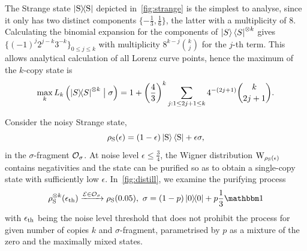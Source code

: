 \documentclass[pra,
aps,
twocolumn,
superscriptaddress,
groupedaddress,
nofootinbib,
reprint
]{revtex4-1}
\begin{document}
The Strange state $\ketbra{\rm{S}}$ depicted in~\cref{fig:strange} is the simplest to analyse, since it only has two distinct components $\{ -\frac{1}{3}, \frac{1}{6} \}$, the latter with a multiplicity of 8.
Calculating the binomial expansion for the components of $\ket{S}\bra{S}^{\otimes k}$ gives $\{(-1)^j 2^{j-k} 3^{-k}\}_{0 \leq j \leq k}$ with multiplicity $8^{k-j} \binom{k}{j}$ for the $j$-th term.
This allows analytical calculation of all Lorenz curve points, hence the maximum of the $k$-copy state is
\begin{equation}\label{eq:Skmax}
    \max_k{L_k \left( \ketbra{S}^{\otimes k} \bigm| \sigma \right)} = 1 + \left(\frac{4}{3}\right)^k \sum\limits_{j: 1 \leq 2j+1 \leq k} 4^{-(2j+1)} \binom{k}{2j+1}.
\end{equation}

Consider the noisy Strange state,
\begin{equation}
    \rho_{\rm{S}}(\epsilon) = (1 - \epsilon) \ket{\rm{S}}\bra{\rm{S}} + \epsilon \sigma,
\end{equation}
in the $\sigma$-fragment $\mathcal{O}_\sigma$.
At noise level $\epsilon \leq \frac{3}{4}$, the Wigner distribution $\W{\rho_{\rm{S}}(\epsilon)}$ contains negativities and the state can be purified so as to obtain a single-copy state with sufficiently low $\epsilon$.
In~\cref{fig:distill}, we examine the purifying process 
\begin{equation}\label{eq:purify}
    \rho_{\rm{S}}^{\otimes k}(\epsilon_{\rm{th}}) \xrightarrow{\E \in \O_\sigma} \rho_{\rm{S}}(0.05),\ \sigma = (1-p)\ketbra{0} + p \frac{1}{3}\id
\end{equation}
with $\epsilon_{\rm{th}}$ being the noise level threshold that does not prohibit the process for given number of copies $k$ and $\sigma$-fragment, parametrised by $p$ as a mixture of the zero and the maximally mixed states.
\end{document}
